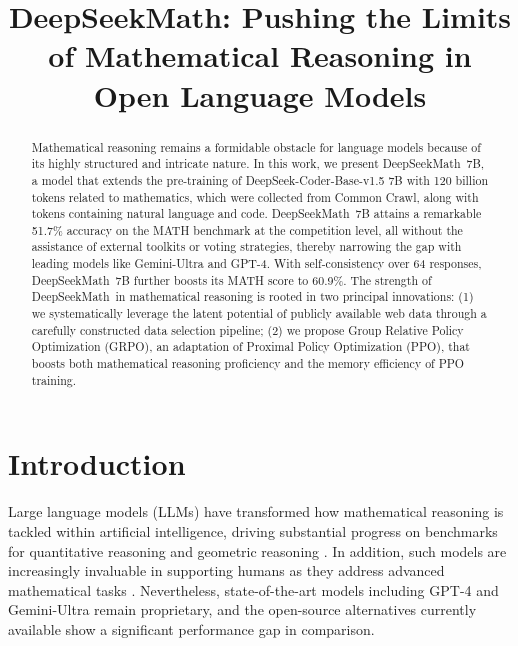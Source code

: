 \title{DeepSeekMath: Pushing the Limits of Mathematical Reasoning in Open Language Models}

\begin{abstract}
Mathematical reasoning remains a formidable obstacle for language models because of its highly structured and intricate nature. In this work, we present DeepSeekMath~7B, a model that extends the pre-training of DeepSeek-Coder-Base-v1.5 7B with 120 billion tokens related to mathematics, which were collected from Common Crawl, along with tokens containing natural language and code. DeepSeekMath~7B attains a remarkable 51.7\% accuracy on the MATH benchmark at the competition level, all without the assistance of external toolkits or voting strategies, thereby narrowing the gap with leading models like Gemini-Ultra and GPT-4. With self-consistency over 64 responses, DeepSeekMath~7B further boosts its MATH score to 60.9\%. The strength of DeepSeekMath~in mathematical reasoning is rooted in two principal innovations: (1) we systematically leverage the latent potential of publicly available web data through a carefully constructed data selection pipeline; (2) we propose Group Relative Policy Optimization (GRPO), an adaptation of Proximal Policy Optimization (PPO), that boosts both mathematical reasoning proficiency and the memory efficiency of PPO training.
\end{abstract}

\section{Introduction}

Large language models (LLMs) have transformed how mathematical reasoning is tackled within artificial intelligence, driving substantial progress on benchmarks for quantitative reasoning \citep{MATH} and geometric reasoning \citep{trinh2024solving}. In addition, such models are increasingly invaluable in supporting humans as they address advanced mathematical tasks \citep{tao}. Nevertheless, state-of-the-art models including GPT-4 \citep{gpt4} and Gemini-Ultra \citep{gemini} remain proprietary, and the open-source alternatives currently available show a significant performance gap in comparison.

